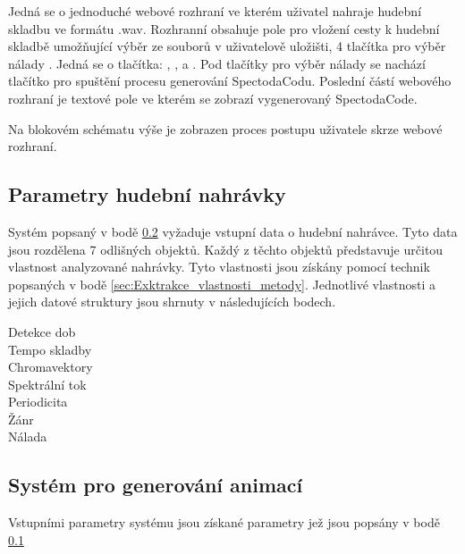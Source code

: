 Jedná se o jednoduché webové rozhraní ve kterém uživatel nahraje hudební skladbu ve formátu .wav. Rozhranní obsahuje pole pro vložení cesty k hudební skladbě umožňující výběr ze souborů v uživatelově uložišti, 4 tlačítka pro výběr nálady
. Jedná se o tlačítka: , ,  a . Pod tlačítky pro výběr nálady se nachází tlačítko pro spuštění procesu generování SpectodaCodu.
 Poslední částí webového rozhraní je textové pole ve kterém se zobrazí vygenerovaný SpectodaCode.


Na blokovém schématu výše je zobrazen proces postupu uživatele skrze webové rozhraní. 

\subsection{Parametry hudební nahrávky} \label{sec:Parametry_nahravky}

Systém popsaný v bodě \ref{sec:System_generovani_animaci} vyžaduje vstupní data o hudební nahrávce. Tyto data jsou rozdělena 7 odlišných objektů. Každý z těchto objektů představuje určitou vlastnost analyzované nahrávky. Tyto vlastnosti jsou získány pomocí technik popsaných v bodě \ref{sec:Exktrakce_vlastnosti_metody}. Jednotlivé vlastnosti a jejich datové struktury jsou shrnuty v následujících bodech.

\begin{description}
    \item[Detekce dob] 
    \item[Tempo skladby]
    \item[Chromavektory]
    \item[Spektrální tok]
    \item[Periodicita]
    \item[Žánr]
    \item[Nálada]      
\end{description}

\subsection{Systém pro generování animací} \label{sec:System_generovani_animaci}

Vstupními parametry systému jsou získané parametry jež jsou popsány v bodě \ref{sec:Parametry_nahravky} 

